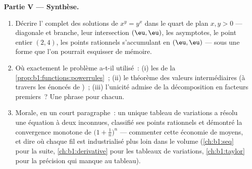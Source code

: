 \begin{problem}
\medskip
\noindent\textbf{Partie V --- Synthèse.}
\begin{enumerate}[resume]
  \item Décrire l' complet des solutions de $x^y = y^x$ dans
        le quart de plan $x, y > 0$ --- diagonale et branche, leur
        intersection $(\eu, \eu)$, les asymptotes, le point entier
        $(2, 4)$, les points rationnels s'accumulant en
        $(\eu, \eu)$ --- sous une forme que l'on pourrait esquisser
        de mémoire.
  \item Où exactement le problème a-t-il utilisé~: (i) les
         de la
        \cref{prop:b1:functions:powerrules}~; (ii) le théorème des
        valeurs intermédiaires (à travers les énoncés de
        )~; (iii) l'unicité admise de la décomposition en
        facteurs premiers~? Une phrase pour chacun.
  \item Morale, en un court paragraphe~: un unique tableau de
        variations a résolu une équation à deux inconnues, classifié
        ses points rationnels et démontré la convergence monotone de
        $\bigl(1 + \frac1n\bigr)^n$ --- commenter cette économie de
        moyens, et dire où chaque fil est industrialisé plus loin
        dans le volume (\cref{ch:b1:seq} pour la suite,
        \cref{ch:b1:derivative} pour les tableaux de variations,
        \cref{ch:b1:taylor} pour la précision qui manque au tableau).
\end{enumerate}
\end{problem}

